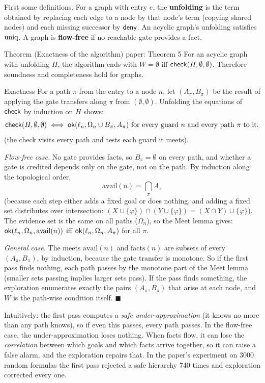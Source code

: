 First some definitions. For a graph with entry $e$, the \textbf{unfolding} is the term obtained by replacing each edge to a node by that node's term (copying shared nodes) and each missing successor by $\mathsf{deny}$. An acyclic graph's unfolding satisfies $\mathrm{uniq}$. A graph is \textbf{flow-free} if no reachable gate provides a fact.

\begin{statement}{Theorem (Exactness of the algorithm) \hfill\normalfont paper: Theorem 5}
For an acyclic graph with unfolding $H$, the algorithm ends with $W=\emptyset$ iff $\mathsf{check}(H,\emptyset,\emptyset)$. Therefore soundness and completeness hold for graphs.
\end{statement}

\begin{plainproof}{Exactness}
For a path $\pi$ from the entry to a node $n$, let $(A_\pi,B_\pi)$ be the result of applying the gate transfers along $\pi$ from $(\emptyset,\emptyset)$. Unfolding the equations of $\mathsf{check}$ by induction on $H$ shows:
\[
\mathsf{check}(H,\emptyset,\emptyset)\iff \mathsf{ok}(\ell_n,\Omega_n\cup B_\pi,A_\pi)\text{ for every guard }n\text{ and every path }\pi\text{ to it.}
\]
(the check visits every path and tests each guard it meets).

\emph{Flow-free case.} No gate provides facts, so $B_\pi=\emptyset$ on every path, and whether a gate is credited depends only on the gate, not on the path. By induction along the topological order,
\[
\mathrm{avail}(n)=\bigcap_\pi A_\pi
\]
(because each step either adds a fixed goal or does nothing, and adding a fixed set distributes over intersection: $(X\cup\{\varphi\})\cap(Y\cup\{\varphi\})=(X\cap Y)\cup\{\varphi\}$). The evidence set is the same on all paths ($\Omega_n$), so the Meet lemma gives: $\mathsf{ok}(\ell_n,\Omega_n,\mathrm{avail}(n))$ iff $\mathsf{ok}(\ell_n,\Omega_n,A_\pi)$ for all $\pi$.

\emph{General case.} The meets $\mathrm{avail}(n)$ and $\mathrm{facts}(n)$ are subsets of every $(A_\pi,B_\pi)$, by induction, because the gate transfer is monotone. So if the first pass finds nothing, each path passes by the monotone part of the Meet lemma (smaller sets passing implies larger sets pass). If the pass finds something, the exploration enumerates exactly the pairs $(A_\pi,B_\pi)$ that arise at each node, and $W$ is the path-wise condition itself. \hfill$\blacksquare$
\end{plainproof}

Intuitively: the first pass computes a \emph{safe under-approximation} (it knows no more than any path knows), so if even this passes, every path passes. In the flow-free case, the under-approximation loses nothing. When facts flow, it can lose the \emph{correlation} between which goals and which facts arrive together, so it can raise a false alarm, and the exploration repairs that. In the paper's experiment on 3000 random formulas the first pass rejected a safe hierarchy 740 times and exploration corrected every one.

